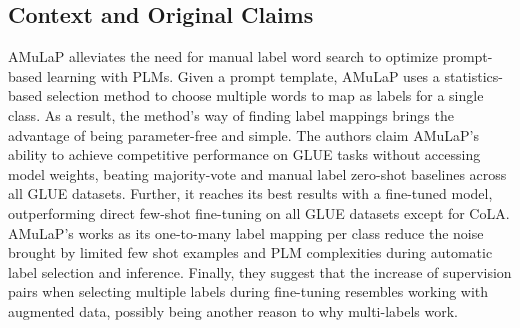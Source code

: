 \subsection{Context and Original Claims}

AMuLaP alleviates the need for manual label word search to optimize prompt-based learning with PLMs. Given a prompt template, AMuLaP uses a statistics-based selection method to choose multiple words to map as labels for a single class. As a result, the method's way of finding label mappings brings the advantage of being parameter-free and simple. The authors claim AMuLaP's ability to achieve competitive performance on GLUE tasks without accessing model weights, beating majority-vote and manual label zero-shot baselines across all GLUE datasets. Further, it reaches its best results with a fine-tuned model, outperforming direct few-shot fine-tuning on all GLUE datasets except for CoLA. AMuLaP's works as its one-to-many label mapping per class reduce the noise brought by limited few shot examples and PLM complexities during automatic label selection and inference. Finally, they suggest that the increase of supervision pairs when selecting multiple labels during fine-tuning resembles working with augmented data, possibly being another reason to why multi-labels work.

